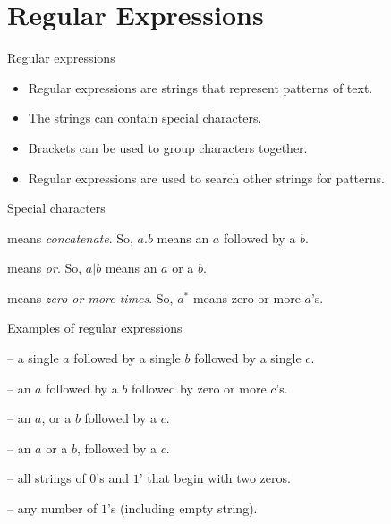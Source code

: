 \documentclass{beamer}
\begin{document}
\section{Regular Expressions}

\begin{frame}{Regular expressions}
  

  \begin{itemize}
    \item Regular expressions are strings that represent patterns of text.
    \item The strings can contain special characters.
    \item Brackets can be used to group characters together.
    \item Regular expressions are used to search other strings for patterns.
  \end{itemize}
  \begin{alertblock}{Special characters}
    \begin{description}[abbb]
      \item[$.$] means \emph{concatenate}. So, $a.b$ means an $a$ followed by a $b$.
      \item[$|$] means \emph{or}. So, $a|b$ means an $a$ or a $b$.
      \item[$*$] means \emph{zero or more times}. So, $a^*$ means zero or more $a$'s.
    \end{description}
  \end{alertblock}
\end{frame}

\begin{frame}{Examples of regular expressions}
  \begin{description}[aaaaaaaa]
    \setlength\itemsep{5mm}
    \item[$a.b.c$] -- a single $a$ followed by a single $b$ followed by a single $c$. 
    \item[$a.b.c^*$] -- an $a$ followed by a $b$ followed by zero or more $c$'s.
    \item[$a|b.c$] -- an $a$, or a $b$ followed by a $c$.
    \item[$(a|b).c$] -- an $a$ or a $b$, followed by a $c$.
    \item[$0.0.(0|1)^*$] -- all strings of $0$'s and $1$' that begin with two zeros.
    \item[$1^*$] -- any number of $1$'s (including empty string).
  \end{description}
\end{frame}
\end{document}
